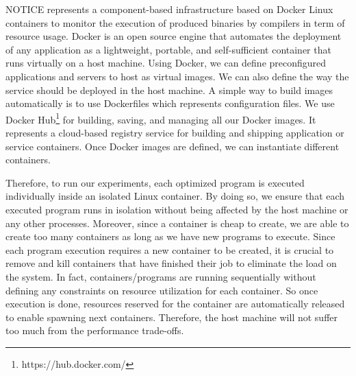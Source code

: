 NOTICE represents a component-based infrastructure based on Docker Linux containers to monitor the execution of produced binaries by compilers in term of resource usage. 
Docker is an open source engine that automates the deployment of any application as a lightweight, portable, and self-sufficient container that runs virtually on a host machine. 
Using Docker, we can define preconfigured applications and servers to host as virtual images. We can also define the way the service should be deployed in the host machine. 
A simple way to build images automatically is to use Dockerfiles which represents configuration files.
We use Docker Hub\footnote{https://hub.docker.com/} for building, saving, and managing all our Docker images. It represents a cloud-based registry service for building and shipping application or service containers.
Once Docker images are defined, we can instantiate different containers.

Therefore, to run our experiments, each optimized program is executed individually inside an isolated Linux container. By doing so, we ensure that each executed program runs in isolation without being affected by the host machine or any other processes. Moreover, since a container is cheap to create, we are able to create too many containers as long as we have new programs to execute. 
Since each program execution requires a new container to be created, it is crucial to remove and kill containers that have finished their job to eliminate the load on the system. In fact, containers/programs are running sequentially without defining any constraints on resource utilization for each container. So once execution is done, resources reserved for the container are automatically released to enable spawning next containers. Therefore, the host machine will not suffer too much from the performance trade-offs.


